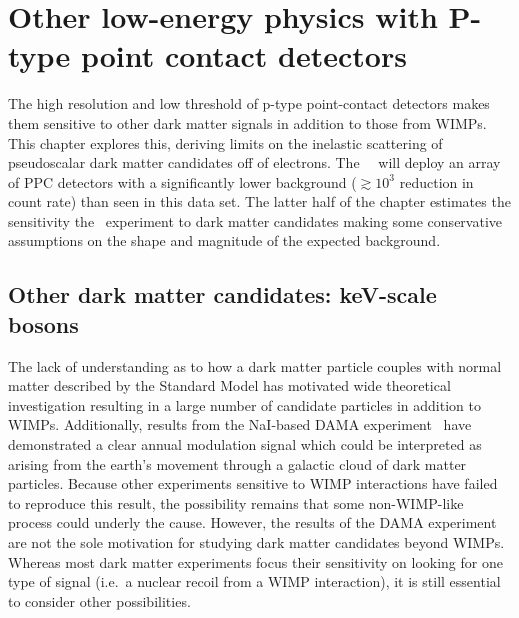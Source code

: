 \chapter{Other low-energy physics with P-type point contact detectors}

	

	The high resolution and low threshold of p-type point-contact detectors makes them sensitive to other dark matter signals in addition to those from WIMPs.  This chapter explores this, deriving limits on the inelastic scattering of pseudoscalar dark matter candidates off of electrons.  The \MJ~\minmod~will deploy an array of PPC detectors with a significantly lower background ($\gtrsim10^{3}$ reduction in count rate) than seen in this data set.  The latter half of the chapter estimates the sensitivity the \MJ~experiment to dark matter candidates making some conservative assumptions on the shape and magnitude of the expected background.  
		
	\section{Other dark matter candidates: keV-scale bosons}
	\label{sec:CalcLimitsOnHeavyAxions}		

	The lack of understanding as to how a dark matter particle couples with normal matter described by the Standard Model has motivated wide theoretical investigation resulting in a large number of candidate particles in addition to WIMPs.  Additionally, results from the NaI-based DAMA experiment~\cite{Bernabei:2005ca} have demonstrated a clear annual modulation signal which could be interpreted as arising from the earth's movement through a galactic cloud of dark matter particles.  Because other experiments sensitive to WIMP interactions have failed to reproduce this result, the possibility remains that some non-WIMP-like process could underly the cause.  However, the results of the DAMA experiment are not the sole motivation for studying dark matter candidates beyond WIMPs.  Whereas most dark matter experiments focus their sensitivity on looking for one type of signal (i.e.~a nuclear recoil from a WIMP interaction), it is still essential to consider other possibilities.  
	
